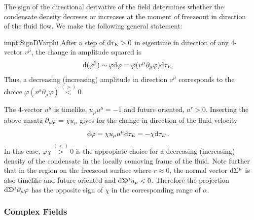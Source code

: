 The sign of the directional derivative of the field determines whether the condensate density decreses or increases at the moment of freezeout in direction of the fluid flow. We make the following general statement:
\begin{impt}{impt:SignDVarphi}
    After a step of ${\text{d}\tau_E>0}$ in eigentime in direction of any 4-vector $v^\mu$, the change in amplitude squared is
    \begin{equation}
        \text{d}(\varphi^2)\sim\varphi\text{d}\varphi=\varphi(v^\mu\partial_\mu\varphi)\text{d}\tau_E.
    \end{equation}
    Thus, a decreasing (increasing) amplitude in direction $v^\mu$ corresponds to the choice ${\varphi(v^\mu\partial_\mu\varphi)\overset{(>)}{<}0}$.
\end{impt}

The 4-vector $u^\mu$ is timelike, ${u_\mu u^\mu=-1}$ and future oriented, $u^\tau>0$. Inserting the above ansatz ${\partial_\mu\varphi=\chi u_\mu}$ gives for the change in direction of the fluid velocity
\begin{equation}
    \text{d}\varphi=\chi u_\mu u^\mu\text{d}\tau_E=-\chi\text{d}\tau_E\,.
\end{equation}
In this case, ${\varphi\chi\overset{(<)}{>}0}$ is the appropiate choice for a decreasing (increasing) density of the condensate in the locally comoving frame of the fluid. Note further that in the region on the freezeout surface where $r\approx 0$, the normal vector ${\text{d}\Sigma^\mu}$ is also timelike and future oriented and ${\text{d}\Sigma^\mu u_\mu<0}$. Therefore the projection ${\text{d}\Sigma^\mu\partial_\mu\varphi}$ has the opposite sign of $\chi$ in the corresponding range of $\alpha$.

\subsubsection{Complex Fields}

